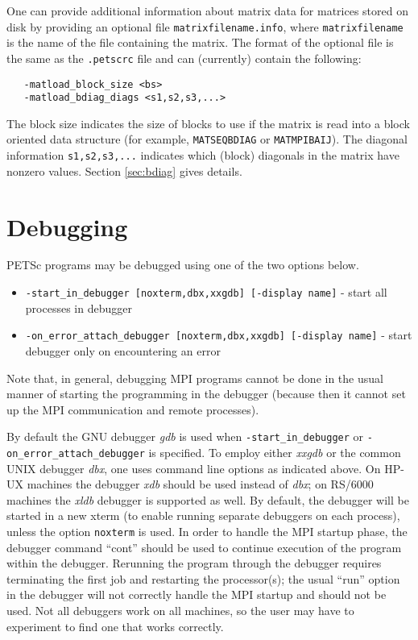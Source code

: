 {One can provide additional information about matrix data for matrices
stored on disk by providing an optional file {\tt matrixfilename.info},
where {\tt matrixfilename} is the name of the file containing the matrix.
The format of the optional file is the same as the {\tt .petscrc} file 
and can (currently) contain the following:
\begin{verbatim}
   -matload_block_size <bs>
   -matload_bdiag_diags <s1,s2,s3,...>
\end{verbatim}
The block size indicates the size of blocks to use if the matrix is
read into a block oriented data structure (for example, 
{\tt MATSEQBDIAG} or {\tt MATMPIBAIJ}). The diagonal information 
{\tt s1,s2,s3,...} indicates
which (block) diagonals in the matrix have nonzero values.
Section \ref{sec:bdiag} gives details.

\section{Debugging}  \label{sec:debugging}

PETSc programs may be debugged using one of the two options below.
\begin{itemize}
\item {\tt -start\_in\_debugger [noxterm,dbx,xxgdb] [-display name]} 
     - start all processes in debugger
\item {\tt -on\_error\_attach\_debugger [noxterm,dbx,xxgdb]
      [-display name]} - start debugger only on encountering an error
\end{itemize}
Note that, in general, debugging MPI programs cannot be done in the usual
manner of starting the programming in the debugger (because then it cannot
set up the MPI communication and remote processes).

By default the GNU debugger {\em gdb} is used when {\tt -start\_in\_debugger}
or {\tt -on\_error\_attach\_debugger} is specified. 
To employ either {\em xxgdb} or the common UNIX debugger {\em dbx}, one uses
command line options as indicated above. On HP-UX machines the debugger
{\em xdb} should be used instead of {\em dbx}; on RS/6000 machines the
{\em xldb} debugger is supported as well.
By  default, the debugger will be started in a new xterm (to enable 
running separate debuggers on each process), unless the option 
{\tt noxterm} is used.
In order to handle the MPI startup phase, the debugger command ``cont'' 
should be used to continue execution of the program within the debugger.
Rerunning the program through the debugger requires terminating 
the first job and restarting the processor(s); the usual ``run'' 
option in the debugger will not correctly handle the MPI startup and
should not be used.  Not all debuggers work on all machines, so the user
may have to experiment to find one that works correctly.

}
